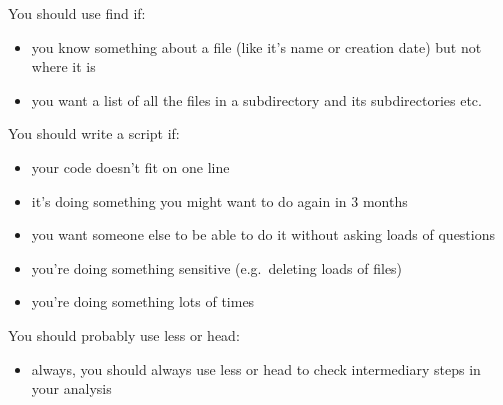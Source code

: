 \documentclass[11pt]{article}
\providecommand{\tightlist}{%
      \setlength{\itemsep}{0pt}\setlength{\parskip}{0pt}}
\begin{document}
You should use find if:

\begin{itemize}
\tightlist
\item
  you know something about a file (like it's name or creation date) but
  not where it is
\item
  you want a list of all the files in a subdirectory and its
  subdirectories etc.
\end{itemize}

You should write a script if:

\begin{itemize}
\tightlist
\item
  your code doesn't fit on one line
\item
  it's doing something you might want to do again in 3 months
\item
  you want someone else to be able to do it without asking loads of
  questions
\item
  you're doing something sensitive (e.g.~deleting loads of files)
\item
  you're doing something lots of times
\end{itemize}

You should probably use less or head:

\begin{itemize}
\tightlist
\item
  always, you should always use less or head to check intermediary steps
  in your analysis
\end{itemize}


\end{document}
